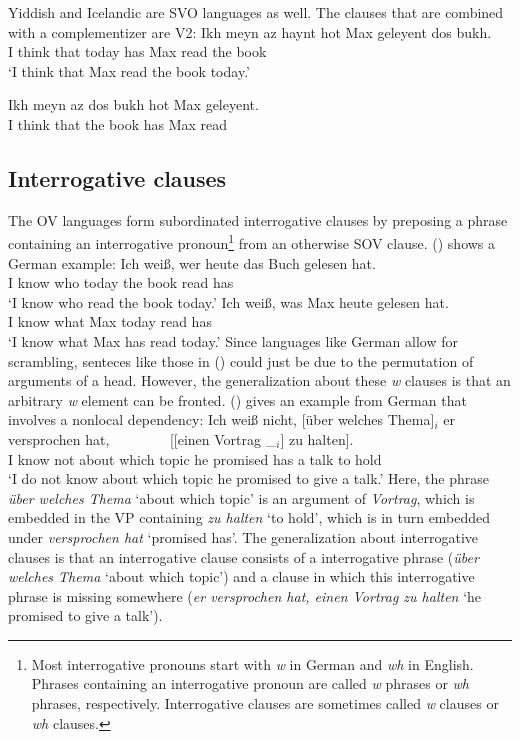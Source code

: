 Yiddish and Icelandic are SVO languages as well. The clauses that are combined with a
complementizer are V2:
\eal
\ex
\gll Ikh meyn  az   haynt hot Max geleyent dos bukh.\footnotemark\\
     I think that today has Max read the book\\\yiddish
{}
\glt `I think that Max read the book today.'

\ex%
\gll Ikh meyn  az   dos bukh hot Max geleyent.\\
     I think that the book has Max read\\

\zl
{}


\subsection{Interrogative clauses}


The OV languages form subordinated interrogative clauses by preposing a phrase containing an
interrogative pronoun\footnote{
Most interrogative pronouns start with \emph{w} in German and \emph{wh} in English. Phrases
containing an interrogative pronoun are called \emph{w} phrases or \emph{wh} phrases,
respectively. Interrogative clauses are sometimes called \emph{w} clauses or \emph{wh} clauses.
} from an
otherwise SOV clause. () shows a German example:
\eal
\ex 
\gll Ich weiß, wer heute das Buch gelesen hat.\\
     I know    who today the book read has\\
\glt `I know who read the book today.'
\ex 
\gll Ich weiß, was Max heute gelesen hat.\\
     I know    what Max today read has\\
\glt `I know what Max has read today.'
\zl
Since languages like German allow for scrambling, senteces like those in () could just be due
to the permutation of arguments of a head. However, the generalization about these \emph{w} clauses
is that an arbitrary \emph{w} element can be fronted. () gives an example from German that
involves a nonlocal dependency:
\ea
\gll Ich weiß nicht, [über welches Thema]$_i$ er versprochen hat,~~~~~~~~ [[einen Vortrag \_$_i$] zu halten].\\
     I know not      \spacebr about which topic he promised has \hspaceThis{[[}a talk to  hold\\
\glt `I do not know about which topic he promised to give a talk.'
\z
Here, the phrase \emph{über welches Thema} `about which topic' is an argument of \emph{Vortrag},
which is embedded in the VP containing \emph{zu halten} `to hold', which is in turn embedded under
\emph{versprochen hat} `promised has'. The generalization about interrogative clauses is that an
interrogative clause consists of a interrogative phrase (\emph{über welches Thema} `about which
topic') and a clause in which this interrogative phrase is missing somewhere (\emph{er versprochen
  hat, einen Vortrag zu halten} `he promised to give a talk').

